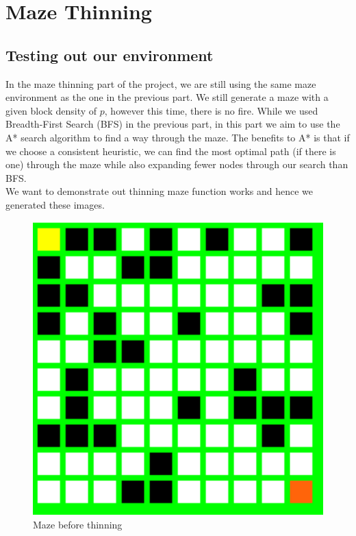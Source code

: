 \documentclass[11pt]{scrartcl} %
\begin{document}
\pagebreak
\section{Maze Thinning}

\subsection{Testing out our environment}
In the maze thinning part of the project, we are still using the same maze environment as the one in the previous part. We still generate a maze with a given block density of $p$, however this time, there is no fire. While we used Breadth-First Search (BFS) in the previous part, in this part we aim to use the A* search algorithm to find a way through the maze. The benefits to A* is that if we choose a consistent heuristic, we can find the most optimal path (if there is one) through the maze while also expanding fewer nodes through our search than BFS.\vspace{2em}\\
We want to demonstrate out thinning maze function works and hence we generated these images. 
\begin{figure}[H]
 	\centering
  	\includegraphics*[scale=0.3]{Maze.png}
	\caption{Maze before thinning}
	\label{fig:example}
 \end{figure}
\end{document}
